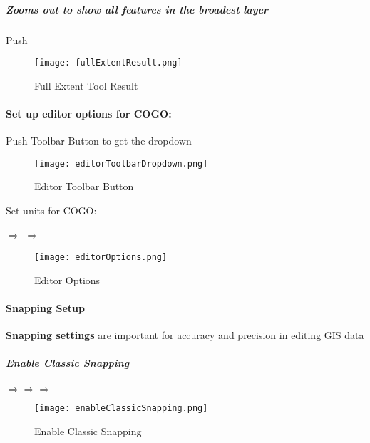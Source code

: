 \subparagraph[Full Extent Button]{Zooms out to show all features in the broadest layer}

{\bigbtn Push }



\begin{figure}[h!]
\centering
    \texttt{[image: fullExtentResult.png]}

\caption{Full Extent Tool Result}
\end{figure}

\clearpage 

\paragraph[Editor Setup for COGO]{\textbf{Set up editor options for COGO:}}

{\bigbtn Push  Toolbar Button to get the dropdown}

\begin{figure}[h!]
\centering
    \texttt{[image: editorToolbarDropdown.png]}

\caption{Editor Toolbar Button}
\end{figure}

\noindent Set units for COGO:

{\bigbtn
\noindent {}$\Rightarrow$ $\Rightarrow$
}

\begin{figure}[h!]
\centering
    \texttt{[image: editorOptions.png]}

\caption{Editor Options}
\end{figure}
%

\clearpage

\paragraph{Snapping Setup}

\textbf{Snapping settings} are important for accuracy and precision in editing GIS data

\subparagraph{Enable Classic Snapping}
{\bigbtn
{}$\Rightarrow$$\Rightarrow$$\Rightarrow$
}

\begin{figure}[h!]
\centering
    \texttt{[image: enableClassicSnapping.png]}

\caption{Enable Classic Snapping}
\end{figure}


